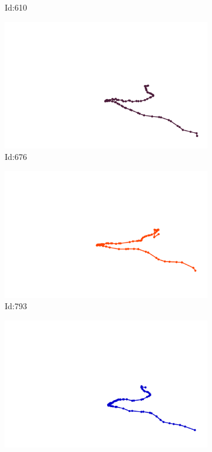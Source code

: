 \documentclass[12pt,twoside]{report}
\begin{document}
\begin{figure}
\begin{subfigure}[b]{0.20\textwidth}
\caption{Id:610}
\end{subfigure}
\begin{subfigure}[b]{0.20\textwidth}
\centering
\includegraphics[width=\textwidth]{../../trajectories/676.png}
\caption{Id:676}
\end{subfigure}
\begin{subfigure}[b]{0.20\textwidth}
\centering
\includegraphics[width=\textwidth]{../../trajectories/793.png}
\caption{Id:793}
\end{subfigure}
\begin{subfigure}[b]{0.20\textwidth}
\centering
\includegraphics[width=\textwidth]{../../trajectories/847.png}

\end{subfigure}
\end{figure}
\end{document}
